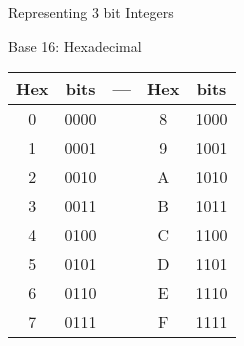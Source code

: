 \begin{withoutheadline}

\begin{frame}[fragile]{Representing 3 bit Integers}
\end{frame}

\begin{frame}[fragile]{Base 16: Hexadecimal}
\begin{tabular}{c|c|c|c|c}
    \hline
    Hex & bits & --- & Hex & bits  \\ \hline
    0 & 0000 & & 8 & 1000 \\
    1 & 0001 & & 9 & 1001 \\
    2 & 0010 & & A & 1010 \\
    3 & 0011 & & B & 1011 \\
    4 & 0100 & & C & 1100 \\
    5 & 0101 & & D & 1101 \\
    6 & 0110 & & E & 1110 \\
    7 & 0111 & & F & 1111 \\    \hline
\end{tabular}
\end{frame}


\end{withoutheadline}

